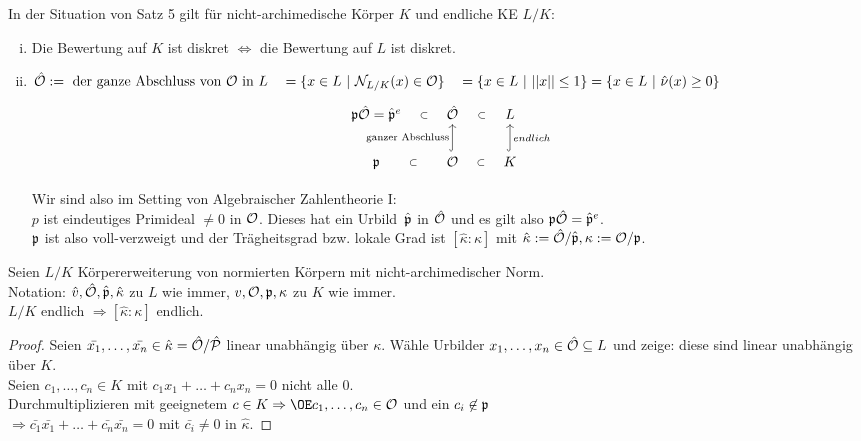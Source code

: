 \begin{Kor}
In der Situation von Satz 5 gilt für nicht-archimedische Körper $K$ und endliche KE $L/K$:
\begin{enumerate}[(i)]
\item Die Bewertung auf $K$ ist diskret $\iff$ die Bewertung auf $L$ ist diskret.
\item $\hO:= \text{ der ganze Abschluss von }\O \text{ in }L \\
\hphantom{\hO \,}= \{x \in L \ | \ \NLK(x) \in \O\}\\
\hphantom{\hO \,}= \{x \in L \ | \ ||x|| \leq 1 \} = \{x \in L \ | \ \hat{\nu}(x) \geq 0\}$\\
\[\begin{tikzcd}
\p\hO=\hat{\p}^e \arrow[draw=none]{r}[sloped,auto=false]{\subset} & \hO \arrow[draw=none]{r}[sloped,auto=false]{\subset} &L\\ %
\p \arrow[draw=none]{r}[sloped,auto=false]{\subset}  & \O \arrow[draw=none]{r}[sloped,auto=false]{\subset} \arrow[hook]{u}{\text{ganzer Abschluss}} &K \arrow[hook, swap]{u}{endlich}
\end{tikzcd}\]

Wir sind also im Setting von Algebraischer Zahlentheorie I:\\
$p$ ist eindeutiges Primideal $\neq 0$ in $\mathcal{O}$. Dieses hat ein \glqq Urbild\grqq \ $\hat{\mathfrak{p}}$ in $\hat{\mathcal{O}}$ und es gilt also $\mathfrak{p}\hat{\mathcal{O}}=\hat{\mathfrak{p}}^e$.\\
$\mathfrak{p}$ ist also voll-verzweigt und der Trägheitsgrad bzw. lokale Grad ist $[\hat \kappa:\kappa]$ mit $\hat \kappa:=\hat{\mathcal{O}}/\hat{\mathfrak{p}}, \kappa:=\mathcal{O}/\mathfrak{p}$.
\end{enumerate}
\end{Kor}

\begin{Bem}
Seien $L/K$ Körpererweiterung von normierten Körpern mit nicht-archimedischer Norm.\\
Notation: $\hat{v}, \hat{\mathcal{O}}, \hat{\mathfrak{p}}, \hat{\kappa}$ zu $L$ wie immer, $v, \mathcal{O}, \mathfrak{p}, \kappa$ zu $K$ wie immer.\\
$L/K$ endlich $\Rightarrow [\hat{\kappa}: \kappa]$ endlich.
\end{Bem}

\begin{proof}
Seien $\bar{x_1}, \dots, \bar{x_n} \in \hat{\kappa}= \hat{\mathcal{O}}/\hat{\mathcal{P}}$ linear unabhängig über $\kappa$.
Wähle Urbilder $x_1, \dots, x_n \in \hat{\mathcal{O}} \subseteq L$ und zeige: diese sind linear unabhängig über $K$.\\
Seien $c_1, \dots, c_n \in K$ mit $c_1 x_1 + \dots + c_nx_n=0$ nicht alle $0$.\\
Durchmultiplizieren mit geeignetem $c\in K \Rightarrow \OE c_1, \dots, c_n \in \O$ und ein $c_i \not \in \mathfrak{p}$\\
$\Rightarrow \bar{c_1}\bar{x_1}+\dots+\bar{c_n}\bar{x_n}=0$ mit $\bar{c_i} \neq 0$ in $\hat{\kappa}$.
\end{proof}

